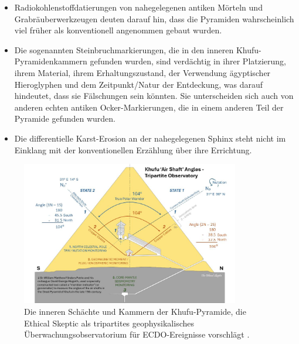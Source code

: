 \documentclass[10pt,twocolumn,letterpaper]{article}
\begin{document}
\begin{flushleft}
\begin{itemize}
    \item Radiokohlenstoffdatierungen von nahegelegenen antiken Mörteln und Grabräuberwerkzeugen deuten darauf hin, dass die Pyramiden wahrscheinlich viel früher als konventionell angenommen gebaut wurden.
    \item Die sogenannten Steinbruchmarkierungen, die in den inneren Khufu-Pyramidenkammern gefunden wurden, sind verdächtig in ihrer Platzierung, ihrem Material, ihrem Erhaltungszustand, der Verwendung ägyptischer Hieroglyphen und dem Zeitpunkt/Natur der Entdeckung, was darauf hindeutet, dass sie Fälschungen sein könnten. Sie unterscheiden sich auch von anderen echten antiken Ocker-Markierungen, die in einem anderen Teil der Pyramide gefunden wurden.
    \item Die differentielle Karst-Erosion an der nahegelegenen Sphinx steht nicht im Einklang mit der konventionellen Erzählung über ihre Errichtung.
\end{itemize}
\end{flushleft}

\begin{figure}[b]
\begin{center}
\includegraphics[width=0.85\textwidth]{shafts.jpg}
\end{center}
   \caption{Die inneren Schächte und Kammern der Khufu-Pyramide, die Ethical Skeptic als tripartites geophysikalisches Überwachungsobservatorium für ECDO-Ereignisse vorschlägt \cite{28}.}
\label{fig:5}
\end{figure}
\end{document}
